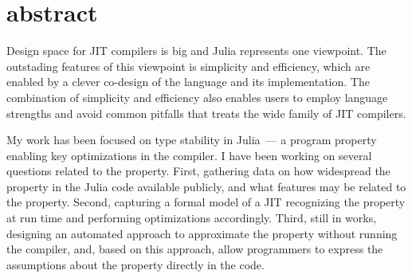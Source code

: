 \documentclass[oneside,openright,titlepage,numbers=noenddot,%
headinclude,footinclude,cleardoublepage=empty,abstract=on,
BCOR=5mm,paper=a4,fontsize=11pt,
dvipsnames
]{scrreprt}
\begin{document}
\frenchspacing
\raggedbottom

\pagestyle{plain}



\chapter*{abstract}
Design space for JIT compilers is big and Julia represents one viewpoint.
The outstading features of this viewpoint is simplicity and efficiency, which
are enabled by a clever co-design of the language and its implementation.
The combination of simplicity and efficiency also enables users to employ
language strengths and avoid common pitfalls that treats the wide family of JIT
compilers.

My work has been focused on type stability in Julia~--- a program property
enabling key optimizations in the compiler. I have been working on several
questions related to the property. First, gathering data on how widespread the
property in the Julia code available publicly, and what features may be related
to the property. Second, capturing a formal model of a JIT recognizing the
property at run time and performing optimizations accordingly. Third, still in
works, designing an automated approach to approximate the property without
running the compiler, and, based on this approach, allow programmers to express
the assumptions about the property directly in the code.


\pagestyle{scrheadings}
{}
\setcounter{tocdepth}{2} %
\setcounter{secnumdepth}{3} %
\manualmark
\markboth{\spacedlowsmallcaps{\contentsname}}{\spacedlowsmallcaps{\contentsname}}
\tableofcontents
{}
\renewcommand{\chaptermark}[1]{\markboth{\spacedlowsmallcaps{#1}}{\spacedlowsmallcaps{#1}}}
\renewcommand{\sectionmark}[1]{\markright{\textsc{\thesection}\enspace\spacedlowsmallcaps{#1}}}
\end{document}
